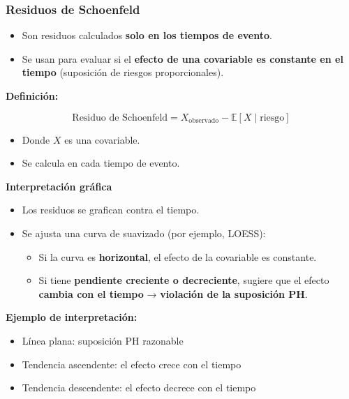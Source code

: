 \documentclass[
]{article}
\providecommand{\tightlist}{%
  \setlength{\itemsep}{0pt}\setlength{\parskip}{0pt}}\usepackage{longtable,booktabs,array}
\begin{document}
\subsubsection{Residuos de Schoenfeld}\label{residuos-de-schoenfeld}

\begin{itemize}
\tightlist
\item
  Son residuos calculados \textbf{solo en los tiempos de evento}.
\item
  Se usan para evaluar si el \textbf{efecto de una covariable es
  constante en el tiempo} (suposición de riesgos proporcionales).
\end{itemize}

\textbf{Definición:}

\[
\text{Residuo de Schoenfeld} = X_{\text{observado}} - \mathbb{E}[X \mid \text{riesgo}]
\]

\begin{itemize}
\tightlist
\item
  Donde \(X\) es una covariable.
\item
  Se calcula en cada tiempo de evento.
\end{itemize}

\textbf{Interpretación gráfica}

\begin{itemize}
\tightlist
\item
  Los residuos se grafican contra el tiempo.
\item
  Se ajusta una curva de suavizado (por ejemplo, LOESS):

  \begin{itemize}
  \tightlist
  \item
    Si la curva es \textbf{horizontal}, el efecto de la covariable es
    constante.
  \item
    Si tiene \textbf{pendiente creciente o decreciente}, sugiere que el
    efecto \textbf{cambia con el tiempo} → \textbf{violación de la
    suposición PH}.
  \end{itemize}
\end{itemize}

\textbf{Ejemplo de interpretación:}

\begin{itemize}
\tightlist
\item
  Línea plana: suposición PH razonable
\item
  Tendencia ascendente: el efecto crece con el tiempo
\item
  Tendencia descendente: el efecto decrece con el tiempo
\end{itemize}
\end{document}
